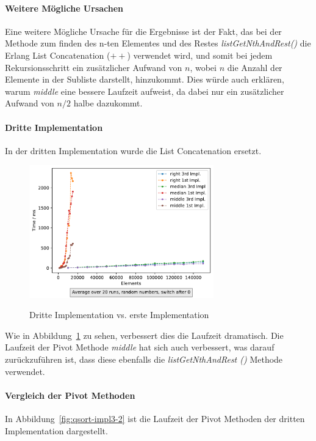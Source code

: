 \paragraph{Weitere Mögliche Ursachen}
Eine weitere Mögliche Ursache für die Ergebnisse ist der Fakt, das bei der
Methode zum finden des n-ten Elementes und des Restes
\textit{listGetNthAndRest()} die Erlang List Concatenation (\(++\)) verwendet
wird, und somit bei jedem Rekursionsschritt ein zusätzlicher Aufwand von
\(n\), wobei \(n\) die Anzahl der Elemente in der Subliste darstellt, hinzukommt.
Dies würde auch erklären, warum \textit{middle} eine bessere Laufzeit
aufweist, da dabei nur ein zusätzlicher Aufwand von \(n/2\) halbe dazukommt.

\paragraph{Dritte Implementation}
In der dritten Implementation wurde die List Concatenation ersetzt.

\begin{figure}[hbt]
    \centering
    \caption{Dritte Implementation vs. erste Implementation}
    \includegraphics[width=8cm]
    {../out/pivotMethods_Implementation3.pdf}\label{fig:qsort-impl3}
\end{figure}

Wie in Abbildung~\ref{fig:qsort-impl3} zu sehen,
verbessert dies die Laufzeit dramatisch.
Die Laufzeit der Pivot Methode \textit{middle} hat sich auch verbessert, was
darauf zurückzuführen ist, dass diese ebenfalls die \textit{listGetNthAndRest
()} Methode verwendet.

\paragraph{Vergleich der Pivot Methoden}

In Abbildung~\ref{fig:qsort-impl3-2} ist die Laufzeit der Pivot Methoden der
dritten Implementation dargestellt.


